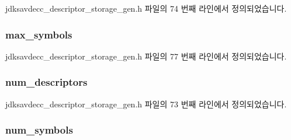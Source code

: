 jdksavdecc\+\_\+descriptor\+\_\+storage\+\_\+gen.\+h 파일의 74 번째 라인에서 정의되었습니다.

\subsubsection[{\texorpdfstring{max\+\_\+symbols}{max_symbols}}]{ max\+\_\+symbols}\hypertarget{structjdksavdecc__descriptor__storage__gen_ac43ac59ff766a629fab28c7738d59cf5}{}\label{structjdksavdecc__descriptor__storage__gen_ac43ac59ff766a629fab28c7738d59cf5}


jdksavdecc\+\_\+descriptor\+\_\+storage\+\_\+gen.\+h 파일의 77 번째 라인에서 정의되었습니다.

\subsubsection[{\texorpdfstring{num\+\_\+descriptors}{num_descriptors}}]{ num\+\_\+descriptors}\hypertarget{structjdksavdecc__descriptor__storage__gen_ab5b9fb75855ea5eaf660e913291dee0b}{}\label{structjdksavdecc__descriptor__storage__gen_ab5b9fb75855ea5eaf660e913291dee0b}


jdksavdecc\+\_\+descriptor\+\_\+storage\+\_\+gen.\+h 파일의 73 번째 라인에서 정의되었습니다.

\subsubsection[{\texorpdfstring{num\+\_\+symbols}{num_symbols}}]{ num\+\_\+symbols}\hypertarget{structjdksavdecc__descriptor__storage__gen_ab11a950ed69a3c45cece05500dba884e}{}\label{structjdksavdecc__descriptor__storage__gen_ab11a950ed69a3c45cece05500dba884e}


